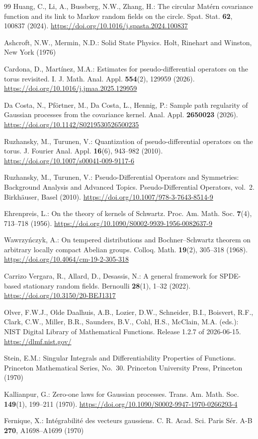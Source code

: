 \documentclass[pdflatex,sn-mathphys,Numbered]{sn-jnl}
\theoremstyle{thmstyleone}%
\theoremstyle{thmstyletwo}%
\theoremstyle{thmstylethree}%
\begin{document}
\begin{thebibliography}{99}
Huang, C., Li, A., Bussberg, N.W., Zhang, H.: The circular Mat\'ern covariance
function and its link to Markov random fields on the circle. Spat. Stat.
\textbf{62}, 100837 (2024). \url{https://doi.org/10.1016/j.spasta.2024.100837}

Ashcroft, N.W., Mermin, N.D.: Solid State Physics. Holt, Rinehart and Winston,
New York (1976)

Cardona, D., Mart\'inez, M.A.: Estimates for pseudo-differential operators on
the torus revisited. I. J. Math. Anal. Appl. \textbf{554}(2), 129959 (2026).
\url{https://doi.org/10.1016/j.jmaa.2025.129959}

Da Costa, N., Pf\"ortner, M., Da Costa, L., Hennig, P.: Sample path regularity
of Gaussian processes from the covariance kernel. Anal. Appl. \textbf{2650023}
(2026). \url{https://doi.org/10.1142/S0219530526500235}

Ruzhansky, M., Turunen, V.: Quantization of pseudo-differential operators on
the torus. J. Fourier Anal. Appl. \textbf{16}(6), 943--982 (2010).
\url{https://doi.org/10.1007/s00041-009-9117-6}

Ruzhansky, M., Turunen, V.: Pseudo-Differential Operators and Symmetries:
Background Analysis and Advanced Topics. Pseudo-Differential Operators, vol.\ 2.
Birkh\"auser, Basel (2010). \url{https://doi.org/10.1007/978-3-7643-8514-9}

Ehrenpreis, L.: On the theory of kernels of Schwartz. Proc. Am. Math. Soc.
\textbf{7}(4), 713--718 (1956).
\url{https://doi.org/10.1090/S0002-9939-1956-0082637-9}

Wawrzy\'nczyk, A.: On tempered distributions and Bochner--Schwartz theorem on
arbitrary locally compact Abelian groups. Colloq. Math. \textbf{19}(2),
305--318 (1968). \url{https://doi.org/10.4064/cm-19-2-305-318}

Carrizo Vergara, R., Allard, D., Desassis, N.: A general framework for
SPDE-based stationary random fields. Bernoulli \textbf{28}(1), 1--32 (2022).
\url{https://doi.org/10.3150/20-BEJ1317}

Olver, F.W.J., Olde Daalhuis, A.B., Lozier, D.W., Schneider, B.I.,
Boisvert, R.F., Clark, C.W., Miller, B.R., Saunders, B.V., Cohl, H.S.,
McClain, M.A. (eds.): NIST Digital Library of Mathematical Functions.
Release 1.2.7 of 2026-06-15. \url{https://dlmf.nist.gov/}

Stein, E.M.: Singular Integrals and Differentiability Properties of Functions.
Princeton Mathematical Series, No.\ 30. Princeton University Press, Princeton
(1970)

Kallianpur, G.: Zero-one laws for Gaussian processes. Trans. Am. Math. Soc.
\textbf{149}(1), 199--211 (1970).
\url{https://doi.org/10.1090/S0002-9947-1970-0266293-4}

Fernique, X.: Int\'egrabilit\'e des vecteurs gaussiens. C. R. Acad. Sci. Paris
S\'er. A-B \textbf{270}, A1698--A1699 (1970)

\end{thebibliography}
\end{document}
